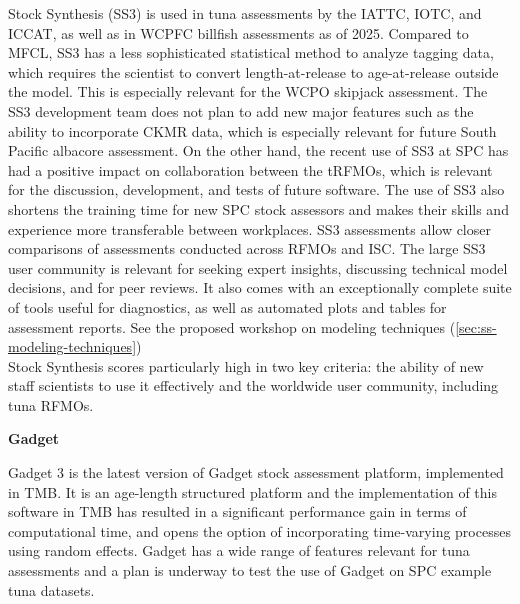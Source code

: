 \documentclass{SCreport}
\begin{document}
\vspace{-1ex}

Stock Synthesis (SS3) is used in tuna assessments by the IATTC, IOTC, and ICCAT,
as well as in WCPFC billfish assessments as of 2025. Compared to MFCL, SS3 has a
less sophisticated statistical method to analyze tagging data, which requires
the scientist to convert length-at-release to age-at-release outside the model.
This is especially relevant for the WCPO skipjack assessment. The SS3
development team does not plan to add new major features such as the ability to
incorporate CKMR data, which is especially relevant for future South Pacific
albacore assessment. On the other hand, the recent use of SS3 at SPC has had a
positive impact on collaboration between the tRFMOs, which is relevant for the
discussion, development, and tests of future software. The use of SS3 also
shortens the training time for new SPC stock assessors and makes their skills
and experience more transferable between workplaces. SS3 assessments allow
closer comparisons of assessments conducted across RFMOs and ISC. The large SS3
user community is relevant for seeking expert insights, discussing technical
model decisions, and for peer reviews. It also comes with an exceptionally
complete suite of tools useful for diagnostics, as well as automated plots and
tables for assessment reports. See the proposed
workshop on modeling techniques (\autoref{sec:ss-modeling-techniques})\\[-4.5ex]

Stock Synthesis scores particularly high in two key criteria: the ability of new
staff scientists to use it effectively and the worldwide user community,
including tuna RFMOs.

\vspace{1ex}

\textbf{Gadget}
\label{sec:gadget-software-evaluation}

\vspace{-1ex}

Gadget 3 is the latest version of Gadget stock assessment platform, implemented
in TMB. It is an age-length structured platform and the implementation of this
software in TMB has resulted in a significant performance gain in terms of
computational time, and opens the option of incorporating time-varying processes
using random effects. Gadget has a wide range of features relevant for tuna
assessments and a plan is underway to test the use of Gadget on SPC example tuna
datasets.\\[-4.5ex]
\end{document}
